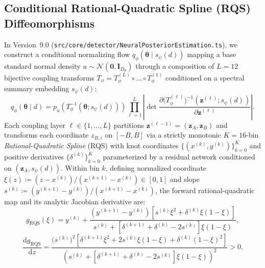 \documentclass[11pt,a4paper,reqno]{article}
\theoremstyle{plain}
\theoremstyle{definition}
\theoremstyle{remark}
\numberwithin{equation}{section}
\begin{document}
\subsection{Conditional Rational-Quadratic Spline (RQS) Diffeomorphisms}
In Version~9.0 (\texttt{src/core/detector/NeuralPosteriorEstimation.ts}), we construct a conditional normalizing flow $q_\phi(\bm{\theta} \mid s_\psi(d))$ mapping a base standard normal density $u \sim \mathcal{N}(\bm{0}, \mathbf{I}_{D_\theta})$ through a composition of $L = 12$ bijective coupling transforms $T_\phi = T_\phi^{(L)} \circ \dots \circ T_\phi^{(1)}$ conditioned on a spectral summary embedding $s_\psi(d)$:
\begin{equation}
q_\phi(\bm{\theta} \mid d) = p_u\!\left(T_\phi^{-1}(\bm{\theta}; s_\psi(d))\right) \prod_{\ell=1}^L \left\lvert \det \frac{\partial \big(T_\phi^{(\ell)}\big)^{-1}(\bm{z}^{(\ell)}; s_\psi(d))}{\partial \bm{z}^{(\ell)}} \right\rvert.
\label{eq:npe_change_of_variables}
\end{equation}
Each coupling layer $\ell \in \{1,\dots,L\}$ partitions $\bm{z}^{(\ell-1)} = (\bm{z}_A, \bm{z}_B)$ and transforms each coordinate $z_{B,i}$ on $[-B, B]$ via a strictly monotonic $K = 16$-bin \emph{Rational-Quadratic Spline} (RQS) with knot coordinates $\{(x^{(k)}, y^{(k)})\}_{k=0}^K$ and positive derivatives $\{\delta^{(k)}\}_{k=0}^K$ parameterized by a residual network conditioned on $(\bm{z}_A, s_\psi(d))$. Within bin $k$, defining normalized coordinate $\xi(z) \coloneqq (z - x^{(k)}) / (x^{(k+1)} - x^{(k)}) \in [0, 1]$ and slope $s^{(k)} \coloneqq (y^{(k+1)} - y^{(k)}) / (x^{(k+1)} - x^{(k)})$, the forward rational-quadratic map and its analytic Jacobian derivative are:
\begin{equation}
g_{\mathrm{RQS}}(\xi) = y^{(k)} + \frac{(y^{(k+1)} - y^{(k)})\left[s^{(k)}\xi^2 + \delta^{(k)}\xi(1-\xi)\right]}{s^{(k)} + \left[\delta^{(k+1)} + \delta^{(k)} - 2s^{(k)}\right]\xi(1-\xi)},
\label{eq:rqs_forward_map}
\end{equation}
\begin{equation}
\frac{\mathrm{d}g_{\mathrm{RQS}}}{\mathrm{d}z} = \frac{\big(s^{(k)}\big)^2 \left[\delta^{(k+1)}\xi^2 + 2s^{(k)}\xi(1-\xi) + \delta^{(k)}(1-\xi)^2\right]}{\left(s^{(k)} + \left[\delta^{(k+1)} + \delta^{(k)} - 2s^{(k)}\right]\xi(1-\xi)\right)^2} > 0.
\label{eq:rqs_jacobian}
\end{equation}
\end{document}
